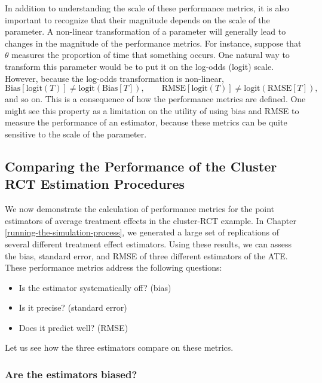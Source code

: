 \documentclass[
]{book}
\providecommand{\tightlist}{%
  \setlength{\itemsep}{0pt}\setlength{\parskip}{0pt}}
\begin{document}
In addition to understanding the scale of these performance metrics, it is also important to recognize that their magnitude depends on the scale of the parameter.
A non-linear transformation of a parameter will generally lead to changes in the magnitude of the performance metrics.
For instance, suppose that \(\theta\) measures the proportion of time that something occurs.
One natural way to transform this parameter would be to put it on the log-odds (logit) scale.
However, because the log-odds transformation is non-linear,
\[
\text{Bias}\left[\text{logit}(T)\right] \neq \text{logit}\left(\text{Bias}[T]\right), \qquad \text{RMSE}\left[\text{logit}(T)\right] \neq \text{logit}\left(\text{RMSE}[T]\right),
\]
and so on.
This is a consequence of how the performance metrics are defined.
One might see this property as a limitation on the utility of using bias and RMSE to measure the performance of an estimator, because these metrics can be quite sensitive to the scale of the parameter.

\subsection{Comparing the Performance of the Cluster RCT Estimation Procedures}\label{clusterRCTperformance}

We now demonstrate the calculation of performance metrics for the point estimators of average treatment effects in the cluster-RCT example.
In Chapter \ref{running-the-simulation-process}, we generated a large set of replications of several different treatment effect estimators.
Using these results, we can assess the bias, standard error, and RMSE of three different estimators of the ATE.
These performance metrics address the following questions:

\begin{itemize}
\tightlist
\item
  Is the estimator systematically off? (bias)
\item
  Is it precise? (standard error)
\item
  Does it predict well? (RMSE)
\end{itemize}

Let us see how the three estimators compare on these metrics.

\subsubsection*{Are the estimators biased?}\label{are-the-estimators-biased}
\end{document}
